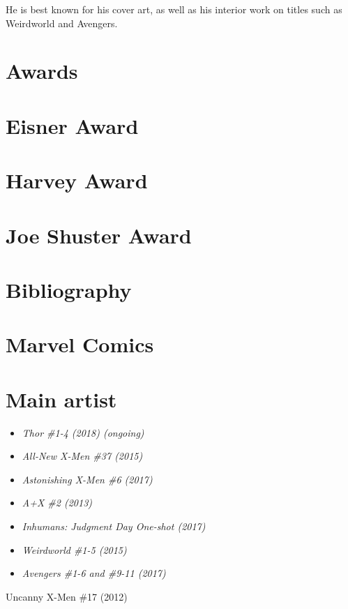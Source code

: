 He is best known for his cover art, as well as his interior work on
titles such as Weirdworld and Avengers.

\section{Awards}\label{awards}

\section{Eisner Award}\label{eisner-award}

\section{Harvey Award}\label{harvey-award}

\section{Joe Shuster Award}\label{joe-shuster-award}

\section{Bibliography}\label{bibliography}

\section{Marvel Comics}\label{marvel-comics}

\section{Main artist}\label{main-artist}

\begin{itemize}
\item
  \emph{Thor \#1-4 (2018) (ongoing)}
\item
  \emph{All-New X-Men \#37 (2015)}
\item
  \emph{Astonishing X-Men \#6 (2017)}
\item
  \emph{A+X \#2 (2013)}
\item
  \emph{Inhumans: Judgment Day One-shot (2017)}
\item
  \emph{Weirdworld \#1-5 (2015)}
\item
  \emph{Avengers \#1-6 and \#9-11 (2017)}
\end{itemize}

Uncanny X-Men \#17 (2012)

